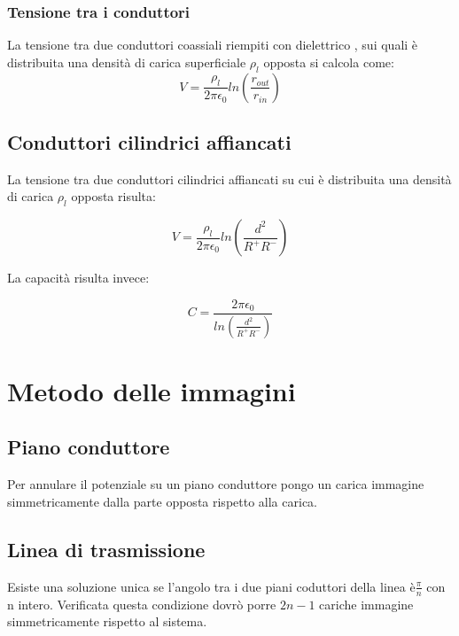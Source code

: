 \documentclass[10pt,a4paper]{report}
\begin{document}
		\subsection{Tensione tra i conduttori}

		La tensione tra due conduttori coassiali riempiti con dielettrico , sui quali è distribuita una densità di carica superficiale $\rho_l$ opposta si calcola come:
		 \begin{equation}
		 V= \frac {\rho_l}  {2 \pi \epsilon_0} ln ( \frac { r_{out} } { r_{in} } )
		 \end{equation}
	
	\section{Conduttori cilindrici affiancati}

		La tensione tra due conduttori cilindrici affiancati su cui è distribuita una densità di carica $\rho_l$ opposta risulta:

		\begin{equation}
		V=\frac{\rho_l}{2 \pi \epsilon_0}{ln(\frac{d^2}{R^+R^-})}
		\end{equation}

		La capacità risulta invece:

		\begin{equation}
		C=\frac{2 \pi \epsilon_0}{ln(\frac{d^2}{R^+R^-})}
		\end{equation}

\chapter{Metodo delle immagini}	

\section{Piano conduttore}

Per annulare il potenziale su un piano conduttore pongo un carica immagine simmetricamente dalla parte opposta rispetto alla carica.

\section{Linea di trasmissione}

Esiste una soluzione unica se l'angolo tra i due piani coduttori della linea è$\frac{\pi}{n}$ con n intero.
Verificata questa condizione dovrò porre $2n-1$ cariche immagine simmetricamente rispetto al sistema.
\end{document}
